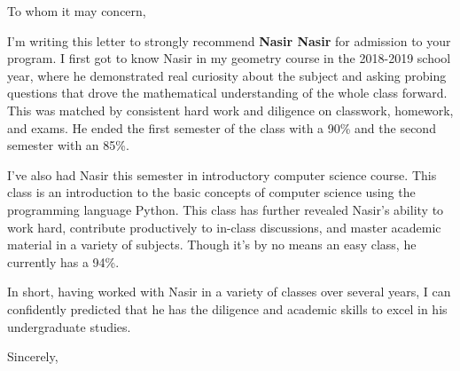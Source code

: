\documentclass{letter}
\begin{document}
\begin{letter}{}
\opening{To whom it may concern,}

I'm writing this letter to strongly recommend  \textbf{Nasir Nasir} for admission to your program.  I first got to know Nasir in my geometry course in the 2018-2019 school year, where  he  demonstrated real curiosity about the subject and asking probing questions that drove the mathematical understanding of the whole class forward. This  was matched by consistent hard work and diligence on classwork, homework, and exams. He ended the first semester of the class with a 90\% and the second semester with an 85\%.  

I've also had Nasir this semester in   introductory computer science course.  This class is an introduction to the basic concepts of computer science using the programming language Python.    This class has further revealed Nasir's ability to work hard, contribute productively to in-class discussions, and master academic material in a variety of subjects.  Though it's by no means an easy class, he currently has a 94\%.    

In short, having worked with Nasir in a variety of classes over several years, I can confidently predicted that he has the diligence and academic skills  to  excel in his undergraduate studies.

\closing{Sincerely,}

\end{letter}
\end{document}
